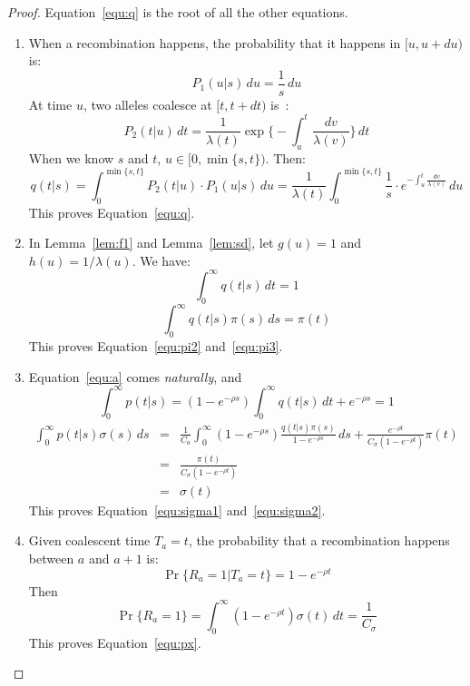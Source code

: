 \documentclass[pdftex,10pt]{article}
\begin{document}
\begin{proof}
  Equation~\ref{equ:q} is the root of all the other equations.

  \begin{enumerate}

  \item When a recombination happens, the probability that it happens in $[u,u+du)$ is:
  \[P_1(u|s)\,du=\frac{1}{s}\,du\]
  At time $u$, two alleles coalesce at $[t,t+dt)$ is~\citep{Hein:2005yq,Griffiths:1994fk}:
  \[P_2(t|u)\,dt=\frac{1}{\lambda(t)}\exp\Bigg\{-\int_u^t\frac{dv}{\lambda(v)}\Bigg\}\,dt\]
  When we know $s$ and $t$, $u\in[0,\min\{s,t\})$. Then:
  \[q(t|s)=\int_0^{\min\{s,t\}}P_2(t|u)\cdot P_1(u|s)\,du
  =\frac{1}{\lambda(t)}\int_0^{\min\{s,t\}}\frac{1}{s}
  \cdot e^{-\int_u^t\frac{dv}{\lambda(v)}}\,du\]
  This proves Equation~\ref{equ:q}.
  
  \item In Lemma~\ref{lem:f1} and Lemma~\ref{lem:sd}, let $g(u)=1$ and
  $h(u)=1/\lambda(u)$. We have:
  \[\int_0^{\infty}q(t|s)\,dt=1\]
  \[\int_0^{\infty}q(t|s)\pi(s)\,ds=\pi(t)\]
  This proves Equation~\ref{equ:pi2} and~\ref{equ:pi3}.

  \item Equation~\ref{equ:a} comes \emph{naturally}, and
    \[ \int_0^{\infty}p(t|s)=(1-e^{-\rho s})\int_0^{\infty}q(t|s)\,dt + e^{-\rho s}=1 \]
  \begin{eqnarray*}
    \int_0^{\infty}p(t|s)\sigma(s)\,ds&=&\frac{1}{C_a}\int_0^{\infty}(1-e^{-\rho s})
    \frac{q(t|s)\pi(s)}{1-e^{-\rho s}}\,ds
    +\frac{e^{-\rho t}}{C_{\sigma}(1-e^{-\rho t})}\pi(t)\\
    &=&\frac{\pi(t)}{C_{\sigma}(1-e^{-\rho t})}\\
    &=&\sigma(t)
  \end{eqnarray*}
  This proves Equation~\ref{equ:sigma1} and~\ref{equ:sigma2}.

  \item Given coalescent time $T_a=t$, the probability that a
  recombination happens between $a$ and $a+1$ is:
  \begin{equation*}
    \Pr\{R_a=1|T_a=t\}=1-e^{-\rho t}
  \end{equation*}
  Then
  \[\Pr\{R_a=1\}=\int_0^{\infty}(1-e^{-\rho t})\sigma(t)\,dt=\frac{1}{C_{\sigma}}\]
  This proves Equation~\ref{equ:px}.

  \end{enumerate}
\end{proof}
\end{document}
